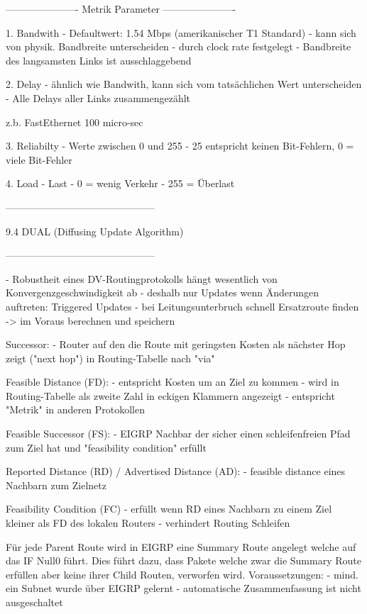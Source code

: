\documentclass[11pt,a4paper]{article}
\begin{document}
----------------------
Metrik Parameter
----------------------

1. Bandwith
- Defaultwert: 1.54 Mbps (amerikanischer T1 Standard)
- kann sich von physik. Bandbreite unterscheiden
- durch clock rate festgelegt
- Bandbreite des langsamsten Links ist ausschlaggebend

2. Delay
- ähnlich wie Bandwith, kann sich vom tatsächlichen Wert 
unterscheiden
- Alle Delays aller Links zusammengezählt

z.b.	FastEthernet	100 micro-sec

3. Reliabilty
- Werte zwischen 0 und 255
- 25 entspricht keinen Bit-Fehlern, 0  = viele Bit-Fehler

4. Load
- Last
- 0 = wenig Verkehr
- 255 = Überlast

---------------------------------------------

	9.4 DUAL (Diffusing Update Algorithm)

---------------------------------------------

- Robustheit eines DV-Routingprotokolls hängt wesentlich von 
Konvergenzgeschwindigkeit ab
- deshalb nur Updates wenn Änderungen auftreten: Triggered Updates
- bei Leitungsunterbruch schnell Ersatzroute finden -> im Voraus 
berechnen und speichern

Successor:
- Router auf den die Route mit geringsten Kosten als nächster Hop 
zeigt ("next hop") in Routing-Tabelle nach "via"

Feasible Distance (FD):
- entspricht Kosten um an Ziel zu kommen
- wird in Routing-Tabelle als zweite Zahl in eckigen Klammern 
angezeigt
- entspricht "Metrik" in anderen Protokollen

Feasible Successor (FS):
- EIGRP Nachbar der sicher einen schleifenfreien Pfad zum Ziel hat 
und "feasibility condition" erfüllt

Reported Distance (RD) / Advertised Distance (AD):
- feasible distance eines Nachbarn zum Zielnetz


Feasibility Condition (FC)
- erfüllt wenn RD eines Nachbarn zu einem Ziel kleiner als FD des 
lokalen Routers
- verhindert Routing Schleifen

Für jede Parent Route wird in EIGRP eine Summary Route angelegt 
welche auf das IF Null0 führt. Dies führt dazu, dass Pakete welche 
zwar die Summary Route erfüllen aber keine ihrer Child Routen, 
verworfen wird.
Voraussetzungen:
- mind. ein Subnet wurde über EIGRP gelernt
- automatische Zusammenfassung ist nicht ausgeschaltet
\end{document}
